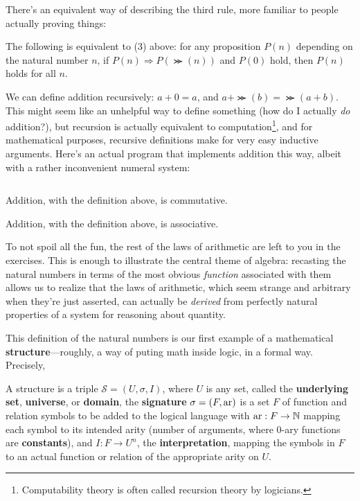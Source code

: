 There's an equivalent way of describing the third rule, more familiar to people actually proving things:
\begin{thm}
  The following is equivalent to (3) above: for any proposition $P(n)$ depending on the natural number $n$, if $P(n) \Rightarrow P(\Succ(n))$
  and $P(0)$ hold, then $P(n)$ holds for all $n$.
\end{thm}



We can define addition recursively: $a + 0 = a$, and $a + \Succ(b) = \Succ(a + b)$.
This might seem like an unhelpful way to define something (how do I actually \textit{do} addition?),
but recursion is actually equivalent to computation\footnote
{
  Computability theory is often called recursion theory by logicians.
},
and for mathematical purposes, recursive definitions make for very easy inductive arguments.
Here's an actual program that implements addition this way, albeit with a rather inconvenient numeral system:
\inputminted{scheme}{chap1/addition.scm}

\begin{exam}
  Addition, with the definition above, is commutative.
\end{exam}


\begin{exam}
  Addition, with the definition above, is associative.
\end{exam}


To not spoil all the fun, the rest of the laws of arithmetic are left to you in the exercises.
This is enough to illustrate the central theme of algebra: recasting the natural numbers in terms of the most obvious \textit{function}
associated with them allows us to realize that the laws of arithmetic, which seem strange and arbitrary when they're just asserted,
can actually be \textit{derived} from perfectly natural properties of a system for reasoning about quantity.

This definition of the natural numbers is our first example of a mathematical \textbf{structure}---roughly, a way of puting math inside logic,
in a formal way.
Precisely,

\begin{definition}
  A structure is a triple $\mathcal{S} = (U, \sigma, I)$, where $U$ is any set, called the \textbf{underlying set}, \textbf{universe},
  or \textbf{domain}, the \textbf{signature} $\sigma = (F, \operatorname{ar})$ is a set $F$ of function and relation symbols to be added to the logical language
  with $\operatorname{ar}: F \to \mathbb{N}$ mapping each symbol to its intended arity (number of arguments, where 0-ary functions are \textbf{constants}),
  and $I: F \to U^{n}$, the \textbf{interpretation}, mapping the symbols in $F$ to an actual function or relation of the appropriate arity on $U$.
\end{definition}

